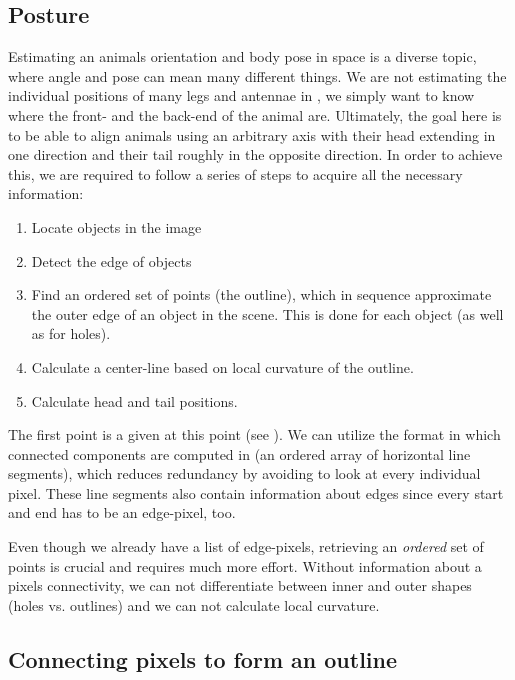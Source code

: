 \documentclass[9pt,lineno]{elife}
\newcommand{\TRex}{\protect\path{TRex}}
\begin{document}
\begin{appendixbox}
\section{Posture}

Estimating an animals orientation and body pose in space is a diverse topic, where angle and pose can mean many different things. We are not estimating the individual positions of many legs and antennae in \TRex{}, we simply want to know where the front- and the back-end of the animal are. Ultimately, the goal here is to be able to align animals using an arbitrary axis with their head extending in one direction and their tail roughly in the opposite direction. In order to achieve this, we are required to follow a series of steps to acquire all the necessary information:

\begin{enumerate}
    \item Locate objects in the image
    \item Detect the edge of objects
    \item Find an ordered set of points (the outline), which in sequence approximate the outer edge of an object in the scene. This is done for each object (as well as for holes).
    \item Calculate a center-line based on local curvature of the outline.
    \item Calculate head and tail positions.
\end{enumerate}

The first point is a given at this point (see ). We can utilize the format in which connected components are computed in \TRex{} (an ordered array of horizontal line segments), which reduces redundancy by avoiding to look at every individual pixel. These line segments also contain information about edges since every start and end has to be an edge-pixel, too.

Even though we already have a list of edge-pixels, retrieving an \textit{ordered} set of points is crucial and requires much more effort. Without information about a pixels connectivity, we can not differentiate between inner and outer shapes (holes vs. outlines) and we can not calculate local curvature. 

\subsection{Connecting pixels to form an outline}


\end{appendixbox}
\end{document}

